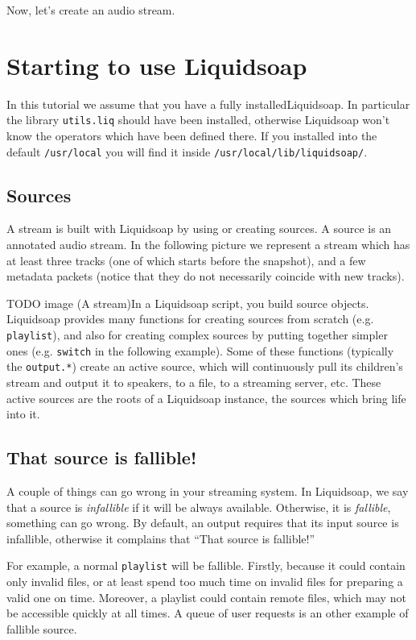 \documentclass{book}
\begin{document}
Now, let's create an audio stream.

\section{Starting to use Liquidsoap}
In this tutorial we assume that you have a fully installedLiquidsoap. In
particular the library \verb+utils.liq+ should have been installed, otherwise
Liquidsoap won't know the operators which have been defined there. If you
installed into the default \verb+/usr/local+ you will find it inside
\verb+/usr/local/lib/liquidsoap/+.

\subsection{Sources}
A stream is built with Liquidsoap by using or creating sources. A source is an
annotated audio stream. In the following picture we represent a stream which has
at least three tracks (one of which starts before the snapshot), and a few
metadata packets (notice that they do not necessarily coincide with new tracks).

TODO image (A stream)In a Liquidsoap script, you build source
objects. Liquidsoap provides many functions for creating sources from scratch
(e.g. \verb+playlist+), and also for creating complex sources by putting
together simpler ones (e.g. \verb+switch+ in the following example). Some of
these functions (typically the \verb+output.*+) create an active source, which
will continuously pull its children's stream and output it to speakers, to a
file, to a streaming server, etc. These active sources are the roots of a
Liquidsoap instance, the sources which bring life into it.

\subsection{That source is fallible!}
A couple of things can go wrong in your streaming system.  In Liquidsoap, we say
that a source is \emph{infallible} if it will be always available.  Otherwise,
it is \emph{fallible}, something can go wrong.  By default, an output requires
that its input source is infallible, otherwise it complains that ``That source
is fallible!''

For example, a normal \verb+playlist+ will be fallible.  Firstly, because it
could contain only invalid files, or at least spend too much time on invalid
files for preparing a valid one on time.  Moreover, a playlist could contain
remote files, which may not be accessible quickly at all times.  A queue of user
requests is an other example of fallible source.
\end{document}
